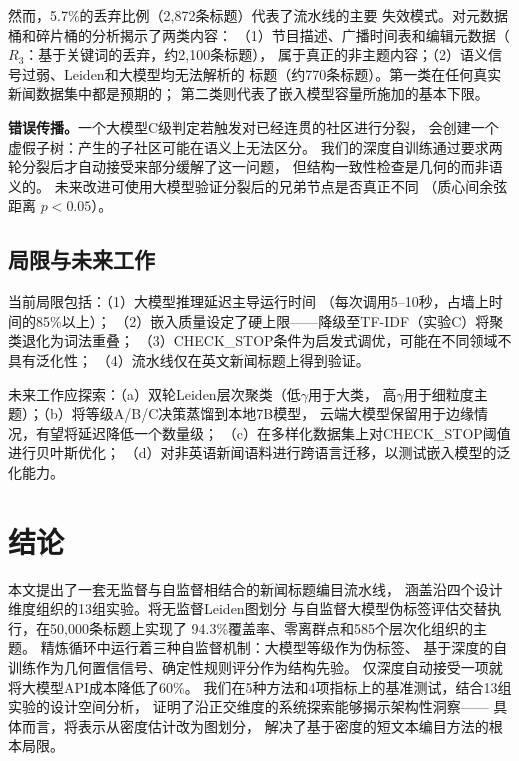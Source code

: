 \documentclass[10pt,twocolumn,twoside]{ctexart}
\begin{document}
然而，5.7\%的丢弃比例（2,872条标题）代表了流水线的主要
失效模式。对元数据桶和碎片桶的分析揭示了两类内容：
（1）节目描述、广播时间表和编辑元数据（$R_3$：基于关键词的丢弃，约2,100条标题），
属于真正的非主题内容；（2）语义信号过弱、Leiden和大模型均无法解析的
标题（约770条标题）。第一类在任何真实新闻数据集中都是预期的；
第二类则代表了嵌入模型容量所施加的基本下限。

\textbf{错误传播。}一个大模型C级判定若触发对已经连贯的社区进行分裂，
会创建一个虚假子树：产生的子社区可能在语义上无法区分。
我们的深度自训练通过要求两轮分裂后才自动接受来部分缓解了这一问题，
但结构一致性检查是几何的而非语义的。
未来改进可使用大模型验证分裂后的兄弟节点是否真正不同
（质心间余弦距离 $p < 0.05$）。

\subsection{局限与未来工作}

当前局限包括：（1）大模型推理延迟主导运行时间
（每次调用5--10秒，占墙上时间的85\%以上）；
（2）嵌入质量设定了硬上限——降级至TF-IDF（实验C）将聚类退化为词法重叠；
（3）CHECK\_STOP条件为启发式调优，可能在不同领域不具有泛化性；
（4）流水线仅在英文新闻标题上得到验证。

未来工作应探索：（a）双轮Leiden层次聚类（低$\gamma$用于大类，
高$\gamma$用于细粒度主题）；（b）将等级A/B/C决策蒸馏到本地7B模型，
云端大模型保留用于边缘情况，有望将延迟降低一个数量级；
（c）在多样化数据集上对CHECK\_STOP阈值进行贝叶斯优化；
（d）对非英语新闻语料进行跨语言迁移，以测试嵌入模型的泛化能力。

\section{结论}

本文提出了一套无监督与自监督相结合的新闻标题编目流水线，
涵盖沿四个设计维度组织的13组实验。将无监督Leiden图划分
与自监督大模型伪标签评估交替执行，在50,000条标题上实现了
94.3\%覆盖率、零离群点和585个层次化组织的主题。
精炼循环中运行着三种自监督机制：大模型等级作为伪标签、
基于深度的自训练作为几何置信信号、确定性规则评分作为结构先验。
仅深度自动接受一项就将大模型API成本降低了60\%。
我们在5种方法和4项指标上的基准测试，结合13组实验的设计空间分析，
证明了沿正交维度的系统探索能够揭示架构性洞察——
具体而言，将表示从密度估计改为图划分，
解决了基于密度的短文本编目方法的根本局限。
\end{document}
